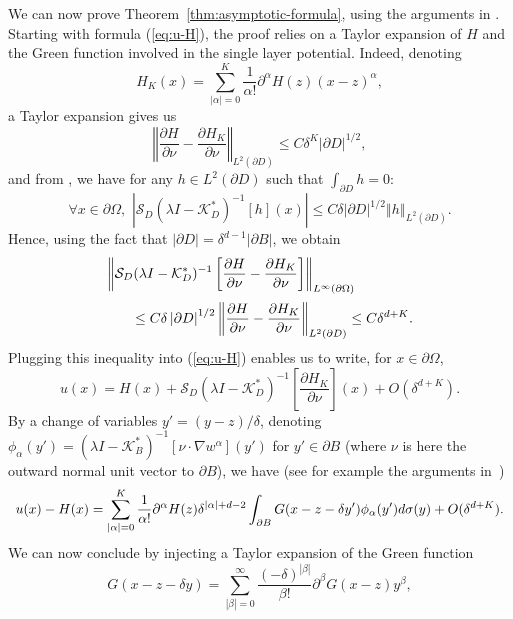 We can now prove Theorem~\ref{thm:asymptotic-formula}, using the
arguments in \cite[pp. 72-73]{ammari2004reconstruction}. Starting with formula
(\ref{eq:u-H}), the proof relies on a Taylor expansion of $H$ and
the Green function involved in the single layer potential. Indeed,
denoting
\[
H_{K}(x)=\sum_{\left|\alpha\right|=0}^{K}\frac{1}{\alpha!}\partial^{\alpha}H(z)(x-z)^{\alpha},
\]
a Taylor expansion gives us
\[
\left\Vert \frac{\partial H}{\partial\nu}-
\frac{\partial H_{K}}{\partial\nu}\right\Vert _{L^{2}(\partial D)}\leq C\delta^{K}\left|\partial D\right|^{1/2},
\]
and from \cite[Formula (4.10)]{ammari2004reconstruction}, we have for any $h\in
L^2(\partial D)$ such that $\int_{\partial D}h=0$:
$$
\forall x\in\partial\Omega,\,\,\left|\mathcal{S}_{D}(\lambda
I-\mathcal{K}_{D}^{*})^{-1}[h](x)\right|\leq C\delta
\left|\partial D\right|^{1/2} \left\Vert h\right\Vert
_{L^{2}(\partial D)}.$$ Hence, using the fact that $\left|\partial
D\right| = \delta^{d-1} \left|\partial B\right|$, we obtain
\[\begin{array}{l}
\ds \left\Vert \mathcal{S}_{D}(\lambda
I-\mathcal{K}_{D}^{*})^{-1}\left[\frac{\partial
H}{\partial\nu}-\frac{\partial
H_{K}}{\partial\nu}\right]\right\Vert
_{L^{\infty}(\partial\Omega)} \\
\nm \qquad \leq \ds C\delta\left|\partial D\right|^{1/2}\left\Vert
\frac{\partial H}{\partial\nu}-\frac{\partial
H_{K}}{\partial\nu}\right\Vert _{L^{2}(\partial D)} \leq
C\delta^{d+K}.
\end{array}
\]
Plugging this inequality into (\ref{eq:u-H}) enables us to write,
for $x\in\partial\Omega$,
\[
u(x)=H(x)+\mathcal{S}_{D}(\lambda
I-\mathcal{K}_{D}^{*})^{-1}\left[\frac{\partial
H_{K}}{\partial\nu}\right](x)+O(\delta^{d+K}).
\]
By a change of variables $y'=(y-z)/\delta$,  denoting
$\phi_{\alpha}(y')= (\lambda
I-\mathcal{K}_{B}^{*})^{-1}[\nu\cdot\nabla w^{\alpha}](y')$ for
$y'\in\partial B$ (where $\nu$ is here the outward normal unit
vector to $\partial B$), we have (see for example the arguments
in~\cite[Section 3]{AGKLY11})
\[\begin{array}{l}
\displaystyle
u(x)-H(x)=\sum_{\left|\alpha\right|=0}^{K}\frac{1}{\alpha!}\partial^{\alpha}H(z)
\delta^{\left|\alpha\right|+d-2} 
\int_{\partial B}G(x-z-\delta
y')\phi_{\alpha}(y')d\sigma(y)+O(\delta^{d+K}).
\end{array} \] We can now conclude by injecting a Taylor expansion of
the Green function
\[
G(x-z-\delta y)=\sum_{\left|\beta\right|=0}^{\infty}\frac{(-\delta)^{\left|\beta\right|}}{\beta!}\partial^{\beta}G(x-z)y^{\beta},
\]
